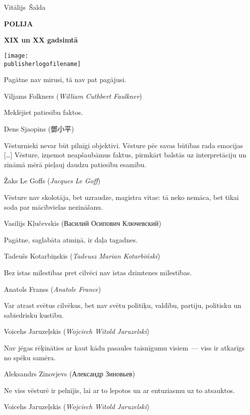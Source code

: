 \documentclass[twoside,a5paper,12pt,fleqn,openany]{extbook}
\newcommand{\coverfrontfilename}{cover_front.pdf}
\newcommand{\publisherlogofilename}{publisher_logo.pdf}
\newcommand{\bookauthor}{Vitālijs~Šalda}
\newcommand{\pltxti}[1]{\textit{\textpolish{#1}}}
\newcommand{\rutxti}[1]{\textrussian{#1}}
\newcommand{\frtxti}[1]{\textit{\textfrench{#1}}}
\newcommand{\entxti}[1]{\textit{\textenglish{#1}}}
\newcommand{\zhtxti}[1]{#1}
\newcommand{\citespace}{[\dots{}]}
\begin{document}


\thispagestyle{plain}~

\begin{titlepage}
{
\centering
{~\par}
\vspace{0.25\textheight}
{\LARGE\bookauthor\par}
\vspace{1.3cm}
{\Huge\textbf{POLIJA}\par}
{\LARGE\textbf{XIX un XX gadsimtā}\par}
\vfill
{\texttt{[image: \\publisherlogofilename]}\par}
}
\end{titlepage}

\epigraph
{Pagātne nav mirusi, tā nav pat pagājusi.}
{Viljams Folkners (\entxti{William Cuthbert Faulkner})}

\epigraph
{Meklējiet patiesību faktos.}
{Dens Sjaopins (\zhtxti{鄧小平})}

\epigraph
{Vēsturnieki nevar būt pilnīgi objektīvi.
Vēsture pēc savas būtības rada emocijas \citespace{}
Vēsture, izņemot neapšaubāmus faktus, pirmkārt balstās uz interpretāciju un zināmā mērā pieļauj daudzu patiesību esamību.}
{Žaks Le Goffs (\frtxti{Jacques Le Goff})}

\epigraph
{Vēsture nav skolotāja, bet uzraudze, magistra vitae: tā neko nemāca, bet tikai soda par mācībvielas nezināšanu.}
{Vasilijs Kļučevskis (\rutxti{Василий Осипович Ключевский})}

\epigraph
{Pagātne, saglabāta atmiņā, ir daļa tagadnes.}
{Tadeušs Kotarbiņskis (\pltxti{Tadeusz Marian Kotarbiński})}

\epigraph
{Bez īstas mīlestības pret cilvēci nav īstas dzimtenes mīlestības.}
{Anatols Franss (\frtxti{Anatole France})}



\epigraph
{Var atrast svētus cilvēkus, bet nav svētu politiķu, valdību, partiju, politisku un sabiedrisku kustību.}
{Voicehs Jaruzeļskis (\pltxti{Wojciech Witold Jaruzelski})}

\epigraph
{Nav jēgas rēķināties ar kaut kādu pasaules taisnīgumu visiem~--- viss ir atkarīgs no spēku samēra.}
{Aleksandrs Zinovjevs (\rutxti{Александр Зиновьев})}

\epigraph
{Ne viss vēsturē ir pelnījis, lai ar to lepotos un ar entuziasmu uz to atsauktos.}
{Voicehs Jaruzeļskis (\pltxti{Wojciech Witold Jaruzelski})}
\end{document}
